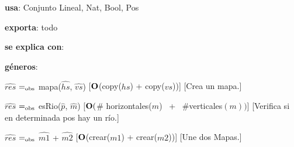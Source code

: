 \begin{Interfaz}
  
    \textbf{usa}: Conjunto Lineal, Nat, Bool, Pos

    \textbf{exporta}: todo 

    \textbf{se explica con}: 
  
    \textbf{géneros}: 
  
  
    {$\hat{res}$ $=_{\mathrm{obs}}$ mapa($\hat{hs}$, $\hat{vs}$)}%
    [$\bold{O}$(copy($hs$) + copy($vs$))] 
    [Crea un mapa.]

    {$\hat{res}$ $=_{\mathrm{obs}}$ esRio($\hat{p}$, $\hat{m}$)}%
    [$\bold{O}($\# horizontales($m$) \ + \ $ \#$verticales$(m))$]
    [Verifica si en determinada pos hay un río.] 

    {$\hat{res}$ $=_{\mathrm{obs}}$ $\hat{m1}$ + $\hat{m2}$}%
    [$\bold{O}$(crear($m1$) + crear($m2$))]
    [Une dos Mapas.] 

  \end{Interfaz}